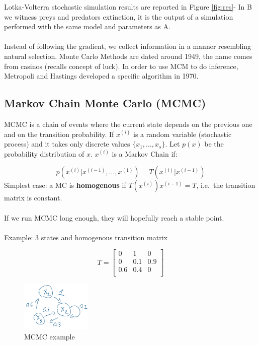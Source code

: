 Lotka-Volterra stochastic simulation results are reported in Figure \ref{fig:res}- In B we witness preys and
predators extinction, it is the output of a simulation performed with
the same model and parameters as A.
\\
\\
\noindent
Instead of following the gradient, we collect information in a manner
resembling natural selection. Monte Carlo Methods are dated around 1949,
the name comes from casinos (recalls concept of luck). In order to use
MCM to do inference, Metropoli and Hastings developed a specific
algorithm in 1970.


\subsection{Markov Chain Monte Carlo (MCMC)}

MCMC is a chain of events where the current state depends on the
previous one and on the transition probability.
\noindent
If $x^{(i)}$ is a random variable (stochastic process) and it takes only
discrete values $\{x_1,\dots,x_s\}$. Let $p(x)$ be the probability
distribution of $x$. $x^{(i)}$ is a Markov Chain if:

$$
p(x^{(i)}|x^{(i-1)},\dots,x^{(1)})=T(x^{(i)}|x^{(i-1)})
$$
\noindent
Simplest case: a MC is \textbf{homogenous} if $T(x^{(i)})x^{(i-1)}=T$,
i.e.~the transition matrix is constant.
\\
\\
\noindent
If we run MCMC long enough, they will hopefully reach a stable point.
\\
\\
\noindent
Example: 3 states and homogenous transition matrix

$$
T = \begin{bmatrix}
0 & 1 & 0\\
0 & 0.1 & 0.9\\ 0.6 & 0.4 & 0\\
\end{bmatrix}
$$

\begin{figure}
\centering
\includegraphics[width=0.3\textwidth]{mcmc.png}
\caption{MCMC example}
\label{fig:MCMCexample}
\end{figure}

